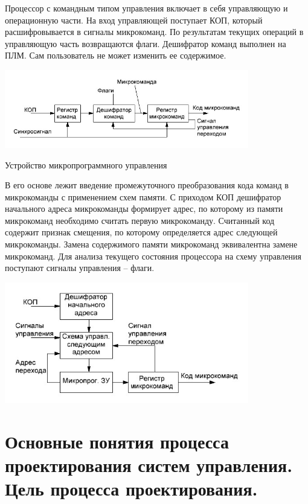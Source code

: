\documentclass[unicode, 12pt, a4paper, oneside]{article}
\begin{document}
Процессор с командным типом управления включает в себя управляющую и операционную части. На вход управляющей поступает КОП, который расшифровывается в сигналы микрокоманд. По результатам текущих операций в управляющую часть возвращаются флаги.
Дешифратор команд выполнен на ПЛМ. Сам пользователь не может изменить ее содержимое.

\begin{center}
\includegraphics[width=0.8\textwidth]{120_microcom.png}
\end{center}
Устройство микропрограммного управления

В его основе лежит введение промежуточного преобразования кода команд в микрокоманды с применением схем памяти. С приходом КОП дешифратор начального адреса микрокоманды формирует адрес, по которому из памяти микрокоманд необходимо считать первую микрокоманду. Считанный код содержит признак смещения, по которому определяется адрес следующей микрокоманды. Замена содержимого памяти микрокоманд эквивалентна замене микрокоманд. Для анализа текущего состояния процессора на схему управления поступают сигналы управления – флаги.

\begin{center}
\includegraphics[width=0.8\textwidth]{120_microprog.png}
\end{center}

\section{Основные понятия процесса проектирования систем управления. Цель процесса проектирования.}
\end{document}
